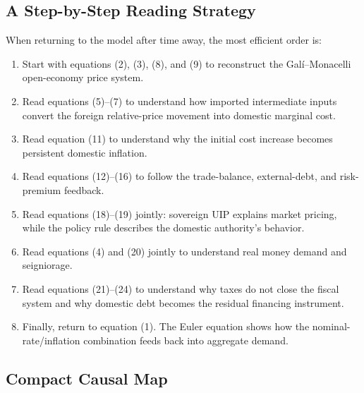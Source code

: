 \subsection{A Step-by-Step Reading Strategy}
\label{app:reading_strategy}

When returning to the model after time away, the most efficient order is:

\begin{enumerate}
    \item Start with equations (2), (3), (8), and (9) to reconstruct the
    Gal\'i--Monacelli open-economy price system.

    \item Read equations (5)--(7) to understand how imported intermediate
    inputs convert the foreign relative-price movement into domestic marginal
    cost.

    \item Read equation (11) to understand why the initial cost increase becomes
    persistent domestic inflation.

    \item Read equations (12)--(16) to follow the trade-balance, external-debt,
    and risk-premium feedback.

    \item Read equations (18)--(19) jointly: sovereign UIP explains market
    pricing, while the policy rule describes the domestic authority's behavior.

    \item Read equations (4) and (20) jointly to understand real money demand and
    seigniorage.

    \item Read equations (21)--(24) to understand why taxes do not close the
    fiscal system and why domestic debt becomes the residual financing
    instrument.

    \item Finally, return to equation (1). The Euler equation shows how the
    nominal-rate/inflation combination feeds back into aggregate demand.
\end{enumerate}

\subsection{Compact Causal Map}
\label{app:causal_map}


